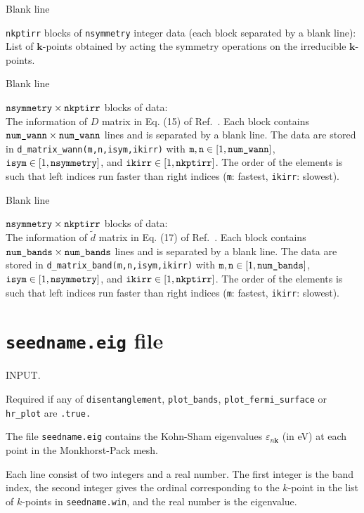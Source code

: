 Blank line 

\verb#nkptirr# blocks of  \verb#nsymmetry# integer data (each block separated by a blank line): 
List of ${\mathbf k}$-points obtained by acting the symmetry operations on the irreducible ${\mathbf k}$-points. 

Blank line 

$\verb#nsymmetry# \times \verb#nkptirr# $ blocks of data: \\
The information of $D$ matrix in Eq. (15) of Ref.~\cite{sakuma-prb13}. 
Each block contains $\verb#num_wann# \times \verb#num_wann#$ lines and is separated by a blank line. 
The data are stored in  \verb#d_matrix_wann(m,n,isym,ikirr)# with 
$\verb#m#, \verb#n# \in [1,\verb#num_wann#]$, $\verb#isym# \in [1,\verb#nsymmetry#]$, and $\verb#ikirr# \in [1,\verb#nkptirr#]$. 
The order of the elements is such that left indices run faster than right indices (\verb#m#: fastest,  \verb#ikirr#: slowest).
 
Blank line 

$\verb#nsymmetry# \times \verb#nkptirr# $ blocks of data: \\
The information of $\tilde d$ matrix in Eq. (17) of Ref.~\cite{sakuma-prb13}. 
Each block contains $\verb#num_bands# \times \verb#num_bands#$ lines and is separated by a blank line.
The data are stored in  \verb#d_matrix_band(m,n,isym,ikirr)# with 
$\verb#m#, \verb#n# \in [1,\verb#num_bands#]$, $\verb#isym# \in [1,\verb#nsymmetry#]$, and $\verb#ikirr# \in [1,\verb#nkptirr#]$. 
The order of the elements is such that left indices run faster than right indices (\verb#m#: fastest,  \verb#ikirr#: slowest). 


\section{{\tt seedname.eig} file}

INPUT. 

Required if any of \verb#disentanglement#, \verb#plot_bands#,
   \verb#plot_fermi_surface# or \verb#hr_plot# are \verb#.true.#

The file \verb#seedname.eig# contains the Kohn-Sham eigenvalues
     $\varepsilon_{n\mathbf{k}}$ (in eV) at each point in the
     Monkhorst-Pack mesh.

Each line consist of two integers and a real number. The first integer
is the band index, the second integer gives the ordinal corresponding
to the $k$-point in the list of $k$-points in \verb#seedname.win#,
and the real number is the eigenvalue. 

